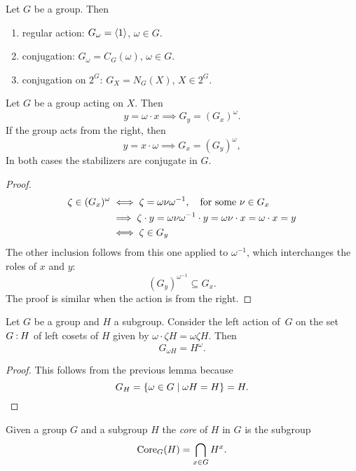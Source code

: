 \begin{rem}\label{basic-stabilizers}
    Let $G$ be a group. Then
    \begin{enumerate}[\rm i)]
        \item \textrm{\rm regular action:} $G_\omega=\langle1\rangle$, $\omega\in G$.
        \item \textrm{\rm conjugation:} $G_\omega=C_G(\omega)$, $\omega\in G$.
        \item \textrm{\rm conjugation on $2^G$:} $G_X=N_G(X)$, $X\in 2^G$.
    \end{enumerate}
\end{rem}

\begin{lem}\label{stabilizer-conjugate}
    Let\/ $G$ be a group acting on $X$. Then
    $$
        y = \omega\cdot x\implies G_y = (G_x)^\omega.
    $$
    If the group acts from the right, then
    $$
        y = x\cdot\omega\implies G_x = (G_y)^\omega,
    $$
    In both cases the stabilizers are conjugate in\/ $G$.
\end{lem}

\begin{proof}
\begin{align*}
    \zeta\in(G_x)^\omega &\iff \zeta=\omega\nu\omega^{-1},\quad\textrm{\rm for some }\nu\in G_x\\
        &\implies \zeta\cdot y=\omega\nu\omega^{-1}\cdot y=\omega\nu\cdot x
            =\omega\cdot x=y\\
        &\iff \zeta\in G_y
\end{align*}
The other inclusion follows from this one applied to $\omega^{-1}$, which interchanges the roles of $x$ and $y$:
$$
    (G_y)^{\omega^{-1}} \subseteq G_x.
$$
The proof is similar when the action is from the right.  \end{proof}


\begin{lem}\label{core}
    Let\/ $G$ be a group and $H$ a subgroup. Consider the left action of\/~$G$ on the set\/ $G\mathbin:H$ of left cosets of\/ $H$ given by $\omega\cdot \zeta H = \omega\zeta H$. Then
    $$
        G_{\omega H}= H^\omega.
    $$
\end{lem}

\begin{proof} This follows from the previous lemma because
$$
    G_H=\{\omega\in G\mid \omega H=H\} = H.
$$
\end{proof}

\begin{defn}\label{Core_G}
    Given a group\/ $G$ and a subgroup\/ $H$ the \textsl{core} of\/ $H$ in $G$ is the subgroup
    $$
        {\rm Core}_G(H) = \bigcap_{x\in G}H^x.
    $$
\end{defn}

